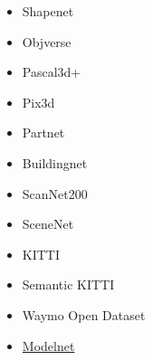 \documentclass{article}
\begin{document}
\begin{itemize}
    \item Shapenet
    \item Objverse
    \item Pascal3d+
    \item Pix3d
    \item Partnet
    \item Buildingnet
    \item ScanNet200
    \item SceneNet
    \item KITTI
    \item Semantic KITTI
    \item Waymo Open Dataset
    \item \href{https://modelnet.cs.princeton.edu/}{Modelnet}
\end{itemize}
\end{document}
